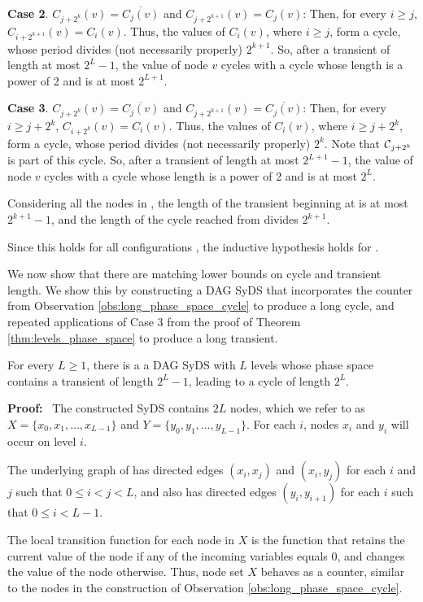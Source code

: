 {\bf Case 2}. $C_{j+2^k}(v) = \overline{C_j(v)}$ and $C_{j+2^{k+1}}(v) = C_j(v)$:
Then, for every $i \geq j$, $C_{i+2^{k+1}}(v) = C_i(v)$.
Thus, the values of $C_i(v)$, where $i \geq j$, form a cycle, 
whose period divides (not necessarily properly) $2^{k+1}$.
So, after a transient of length at most $2^L-1$,
the value of node $v$ cycles with a cycle whose length is a power of 2 and is at most $2^{L+1}$.

{\bf Case 3}. $C_{j+2^k}(v) = \overline{C_j(v)}$ and $C_{j+2^{k+1}}(v) = \overline{C_j(v)}$:
Then, for every $i \geq j + 2^k$, $C_{i+2^k}(v) = C_i(v)$.
Thus, the values of $C_i(v)$, where $i \geq j + 2^k$, form a cycle, 
whose period divides (not necessarily properly) $2^k$.
Note that  $\mbox{$\mathcal{C}$}_{j+2^k}$ is part of this cycle.
So, after a transient of length at most $2^{L+1}-1$,
the value of node $v$ cycles with a cycle whose length is a power of 2 and is at most $2^L$.


Considering all the nodes in \cals{}, the length of the transient beginning at  \calc{} 
is at most $2^{k+1}-1$, 
and the length of the cycle reached from  \calc{} divides $2^{k+1}$.

Since this holds for all configurations \calc{}, the inductive hypothesis holds for \cals{}.
\QED

We now show that there are matching lower bounds on cycle and transient length.
We show this by constructing a DAG SyDS
that incorporates the counter from Observation \ref{obs:long_phase_space_cycle}
to produce a long cycle,
and repeated applications of Case 3 from the proof of Theorem \ref{thm:levels_phase_space}
to produce a long transient.

\begin{theorem}\label{thm:path_length_lower_bounds}
For every $L  \geq 1$,
there is a a DAG SyDS with $L$ levels
whose phase space contains a transient of length $2^L-1$,
leading to a cycle of length $2^L$.
\end{theorem}
\noindent
\textbf{Proof:}~ 
The constructed SyDS \cals{}  contains
$2L$ nodes, which we refer to as $X = \{x_0, x_1, \dots , x_{L-1}\}$ 
and $Y = \{y_0, y_1, \dots , y_{L-1}\}$.
For each $i$, nodes $x_i$ and $y_i$ will occur on level $i$.

The underlying graph of \cals{} has directed edges
$(x_i, x_j)$  and $(x_i, y_j)$ for each $i$ and $j$  such that $0 \leq i < j  < L$,
and also has directed edges $(y_i, y_{i+1})$ for each $i$ such that $0 \leq i < L-1$.

The local transition function for each node in $X$ is the function 
that retains the current value of the node if any of the incoming variables equals 0,
and changes the value of the node otherwise.
Thus, node set $X$ behaves as a counter,
similar to the nodes in the construction of Observation \ref{obs:long_phase_space_cycle}.

